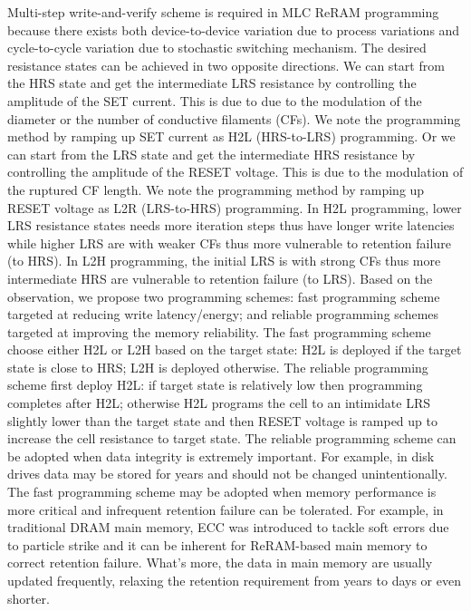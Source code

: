 Multi-step write-and-verify scheme is required in MLC ReRAM programming because there exists both device-to-device variation due to process variations and cycle-to-cycle variation due to stochastic switching mechanism. The desired resistance states can be achieved in two opposite directions. We can start from the HRS state and get the intermediate LRS resistance by controlling the amplitude of the SET current. This is due to due to the modulation of the diameter or the number of conductive filaments (CFs). We note the programming method by ramping up SET current as H2L (HRS-to-LRS) programming. Or we can start from the LRS state and get the intermediate HRS resistance by controlling the amplitude of the RESET voltage. This is due to the modulation of the ruptured CF length. We note the programming method by ramping up RESET voltage as L2R (LRS-to-HRS) programming. In H2L programming, lower LRS resistance states needs more iteration steps thus have longer write latencies while higher LRS are with weaker CFs thus more vulnerable to retention failure (to HRS). In L2H programming, the initial LRS is with strong CFs thus more intermediate HRS are vulnerable to retention failure (to LRS). Based on the observation, we propose two programming schemes: fast programming scheme targeted at reducing write latency/energy; and reliable programming schemes targeted at improving the memory reliability. The fast programming scheme choose either H2L or L2H based on the target state: H2L is deployed if the target state is close to HRS; L2H is deployed otherwise. The reliable programming scheme first deploy H2L: if target state is relatively low then programming completes after H2L; otherwise H2L programs the cell to an intimidate LRS slightly lower than the target state and then RESET voltage is ramped up to increase the cell resistance to target state. The reliable programming scheme can be adopted when data integrity is extremely important. For example, in disk drives data may be stored for years and should not be changed unintentionally. The fast programming scheme may be adopted when memory performance is more critical and infrequent retention failure can be tolerated. For example, in traditional DRAM main memory, ECC was introduced to tackle soft errors due to particle strike and it can be inherent for ReRAM-based main memory to correct retention failure. What's more, the data in main memory are usually updated frequently, relaxing the retention requirement from years to days or even shorter. 




